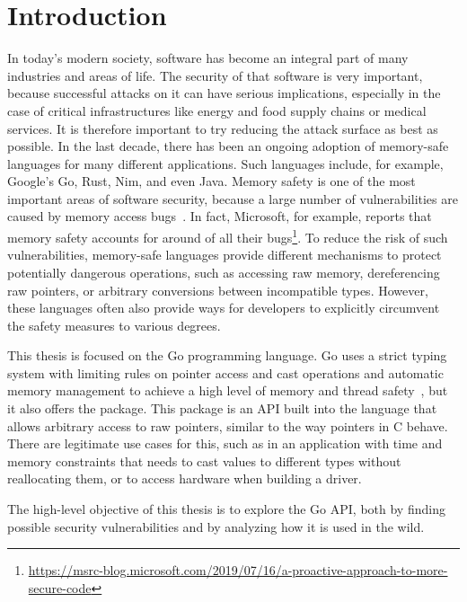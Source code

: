 
\chapter{Introduction}\label{ch:introduction}

In today's modern society, software has become an integral part of many industries and areas of life.
The security of that software is very important, because successful attacks on it can have serious implications,
especially in the case of critical infrastructures like energy and food supply chains or medical services.
It is therefore important to try reducing the attack surface as best as possible.
In the last decade, there has been an ongoing adoption of memory-safe languages for many different applications.
Such languages include, for example, Google's Go, Rust, Nim, and even Java.
Memory safety is one of the most important areas of software security, because a large number of vulnerabilities are
caused by memory access bugs~\cite{heffley2004}.
In fact, Microsoft, for example, reports that memory safety accounts for around  of all their
bugs\footnote{\scriptsize\url{https://msrc-blog.microsoft.com/2019/07/16/a-proactive-approach-to-more-secure-code}}.
To reduce the risk of such vulnerabilities, memory-safe languages provide different mechanisms to protect potentially
dangerous operations, such as accessing raw memory, dereferencing raw pointers, or arbitrary conversions between
incompatible types.
However, these languages often also provide ways for developers to explicitly circumvent the safety measures to various
degrees.

This thesis is focused on the Go programming language.
Go uses a strict typing system with limiting rules on pointer access and cast operations and automatic memory management
to achieve a high level of memory and thread safety~\cite{sibiryov2017}, but it also offers the \unsafe{} package.
This package is an \acrshort{API} built into the language that allows arbitrary access to raw pointers, similar to the
way pointers in C behave.
There are legitimate use cases for this, such as in an application with time and memory constraints that needs to cast
values to different types without reallocating them, or to access hardware when building a driver.

\begin{hero}
    The high-level objective of this thesis is to explore the Go \unsafe{} \acrshort{API}, both by finding possible
    security vulnerabilities and by analyzing how it is used in the wild.
\end{hero}


